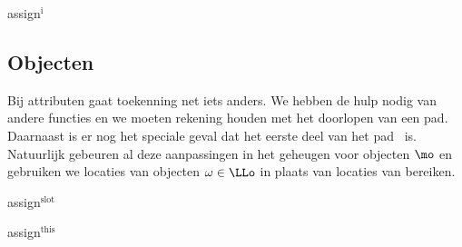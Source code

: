 \begin{NSAxiom}{assign$^\text{i}$}
  \begin{prooftree}
  \end{prooftree}
  \begin{NSConditions}
  \end{NSConditions}
\end{NSAxiom}

\subsection{Objecten}

Bij attributen gaat toekenning net iets anders. We hebben de hulp nodig van andere functies en we moeten rekening houden met het doorlopen van een pad. Daarnaast is er nog het speciale geval dat het eerste deel van het pad \THIS\ is. Natuurlijk gebeuren al deze aanpassingen in het geheugen voor objecten $\mo$ en gebruiken we locaties van objecten $\omega\in\LLo$ in plaats van locaties van bereiken.

\begin{NSAxiom}{assign$^\text{slot}$}
  \begin{prooftree}
  \end{prooftree}
  \begin{NSConditions}
  \end{NSConditions}
\end{NSAxiom}

\begin{NSAxiom}{assign$^\text{this}$}
  \begin{prooftree}
  \end{prooftree}
  \begin{NSConditions}
  \end{NSConditions}
\end{NSAxiom}

